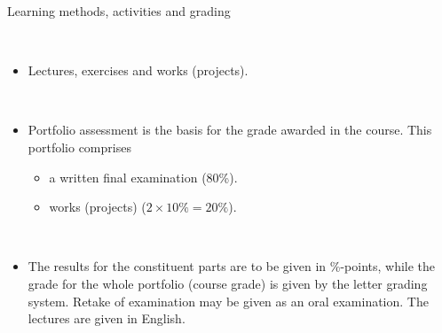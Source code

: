 \documentclass[10pt,ignorenonframetext,]{beamer}
\providecommand{\tightlist}{%
  \setlength{\itemsep}{0pt}\setlength{\parskip}{0pt}}
\begin{document}
\begin{frame}

\begin{block}{Learning methods, activities and grading}

\(~\)

\begin{itemize}
\tightlist
\item
  Lectures, exercises and works (projects).
\end{itemize}

~

\begin{itemize}
\tightlist
\item
  Portfolio assessment is the basis for the grade awarded in the course.
  This portfolio comprises

  \begin{itemize}
  \tightlist
  \item
    a written final examination (80\%).
  \item
    works (projects) (\(2\times 10\%=20\%\)).
  \end{itemize}
\end{itemize}

~

\begin{itemize}
\tightlist
\item
  The results for the constituent parts are to be given in \%-points,
  while the grade for the whole portfolio (course grade) is given by the
  letter grading system. Retake of examination may be given as an oral
  examination. The lectures are given in English.
\end{itemize}

\end{block}

\end{frame}
\end{document}
